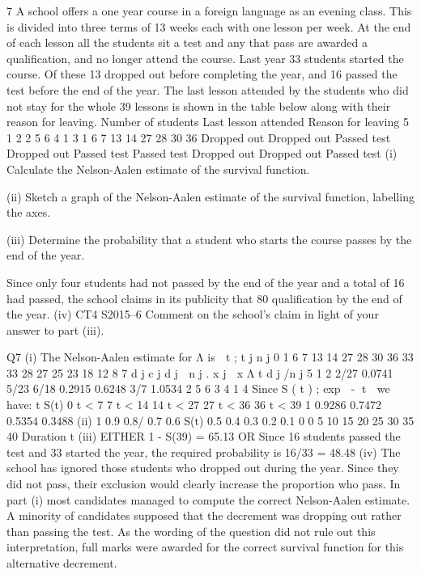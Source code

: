 \documentclass[a4paper,12pt]{article}
\begin{document}
7
A school offers a one year course in a foreign language as an evening class. This is divided into three terms of 13 weeks each with one lesson per week. At the end of
each lesson all the students sit a test and any that pass are awarded a qualification, and no longer attend the course.
Last year 33 students started the course. Of these 13 dropped out before completing the year, and 16 passed the test before the end of the year. The last lesson attended by
the students who did not stay for the whole 39 lessons is shown in the table below along with their reason for leaving.
Number of
students Last lesson
attended Reason for
leaving
5
1
2
2
5
6
4
1
3 1
6
7
13
14
27
28
30
36 Dropped out
Dropped out
Passed test
Dropped out
Passed test
Passed test
Dropped out
Dropped out
Passed test
(i) Calculate the Nelson-Aalen estimate of the survival function.

(ii) Sketch a graph of the Nelson-Aalen estimate of the survival function, labelling
the axes.

(iii) Determine the probability that a student who starts the course passes by the
end of the year.

Since only four students had not passed by the end of the year and a total of 16 had
passed, the school claims in its publicity that 80%
qualification by the end of the year.
(iv)
CT4 S2015–6
Comment on the school’s claim in light of your answer to part (iii).

Q7
(i)
The Nelson-Aalen estimate for Λ is  t ;\+\;
t j n j
0
1
6
7
13
14
27
28
30
36 33
33
28
27
25
23
18
12
8
7
d j
c j
d j
 n j .
x j  x
Λ t
d j /n j
5
1
2
2/27 0.0741
5/23
6/18 0.2915
0.6248
3/7 1.0534
2
5
6
3
4
1
4
Since S ( t ) ;\+\; exp  - t  we have:
t S(t)
0 \leq t < 7
7 \leq t < 14
14 \leq t < 27
27 \leq t < 36
36 \leq t < 39 1
0.9286
0.7472
0.5354
0.3488
(ii)
1
0.9
0.8/
0.7
0.6
S(t) 0.5
0.4
0.3
0.2
0.1
0
0
5
10
15
20
25
30
35
40
Duration t
(iii)
EITHER
1 - S(39) = 65.13%
OR
Since 16 students passed the test and 33 started the year, the required
probability is 16/33 = 48.48%
(iv)
The school has ignored those students who dropped out during the year.
Since they did not pass, their exclusion would clearly increase the proportion
who pass.
In part (i) most candidates managed to compute the correct Nelson-Aalen
estimate. A minority of candidates supposed that the decrement was
dropping out rather than passing the test. As the wording of the question did
not rule out this interpretation, full marks were awarded for the correct survival
function for this alternative decrement.
\end{document}
